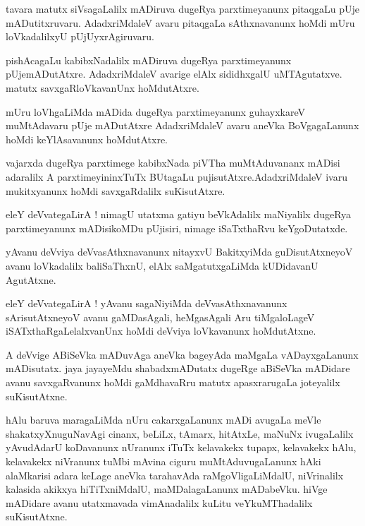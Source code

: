 \documentclass{article}
\begin{document}
\begin{mng}%
tavara matutx siVsagaLalilx mADiruva dugeRya parxtimeyanunx pitaqgaLu pUje mADutitxruvaru. 
AdadxriMdaleV avaru pitaqgaLa sAthxnavanunx hoMdi mUru loVkadalilxyU pUjUyxrAgiruvaru.
\end{mng}

\begin{mng}%
pishAcagaLu kabibxNadalilx mADiruva dugeRya parxtimeyanunx pUjemADutAtxre. AdadxriMdaleV avarige 
elAlx sididhxgalU uMTAgutatxve. matutx savxgaRloVkavanUnx hoMdutAtxre.
\end{mng}

\begin{mng}%
mUru loVhgaLiMda mADida dugeRya parxtimeyanunx guhayxkareV muMtAdavaru pUje mADutAtxre 
AdadxriMdaleV avaru aneVka BoVgagaLanunx hoMdi keYlAsavanunx hoMdutAtxre.
\end{mng}

\begin{mng}%
vajarxda dugeRya parxtimege kabibxNada piVTha muMtAduvananx mADisi adaralilx A parxtimeyininxTuTx 
BUtagaLu pujisutAtxre.AdadxriMdaleV ivaru mukitxyanunx hoMdi savxgaRdalilx suKisutAtxre.
\end{mng}

\begin{mng}%
eleY deVvategaLirA ! nimagU utatxma gatiyu beVkAdalilx maNiyalilx dugeRya parxtimeyanunx 
mADisikoMDu pUjisiri, nimage iSaTxthaRvu keYgoDutatxde.
\end{mng}

\begin{mng}%
yAvanu deVviya deVvasAthxnavanunx nitayxvU BakitxyiMda guDisutAtxneyoV avanu loVkadalilx 
baliSaThxnU, elAlx saMgatutxgaLiMda kUDidavanU AgutAtxne.
\end{mng}

\begin{mng}%
eleY deVvategaLirA ! yAvanu sagaNiyiMda deVvasAthxnavanunx sArisutAtxneyoV avanu gaMDasAgali, 
heMgasAgali Aru tiMgaloLageV iSATxthaRgaLelalxvanUnx hoMdi deVviya loVkavanunx hoMdutAtxne.
\end{mng}

\begin{mng}%
A deVvige ABiSeVka mADuvAga aneVka bageyAda maMgaLa vADayxgaLanunx mADisutatx. jaya jayayeMdu 
shabadxmADutatx dugeRge aBiSeVka mADidare avanu savxgaRvanunx hoMdi gaMdhavaRru matutx 
apasxrarugaLa joteyalilx suKisutAtxne.
\end{mng}

\begin{mng}%
hAlu baruva maragaLiMda nUru cakarxgaLanunx mADi avugaLa meVle shakatxyXnuguNavAgi cinanx, beLiLx, 
tAmarx, hitAtxLe, maNuNx ivugaLalilx yAvudAdarU koDavanunx nUranunx iTuTx kelavakekx tupapx, 
kelavakekx hAlu, kelavakekx niVranunx tuMbi mAvina ciguru muMtAduvugaLanunx hAki alaMkarisi adara 
keLage aneVka tarahavAda raMgoVligaLiMdalU, niVrinalilx kalasida akikxya hiTiTxniMdalU, 
maMDalagaLanunx mADabeVku. hiVge mADidare avanu utatxmavada vimAnadalilx kuLitu veYkuMThadalilx 
suKisutAtxne.
\end{mng}
\end{document}
